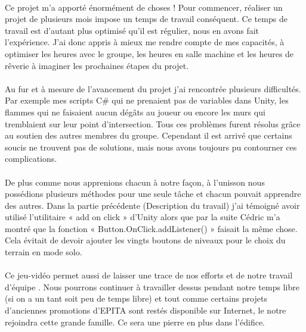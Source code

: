 \documentclass[titlepage, 13px, a4paper]{report}
\begin{document}
\paragraph{} \hspace{0pt}
Ce projet m'a apporté énormément de choses ! Pour commencer, réaliser un projet
de plusieurs mois impose un temps de travail conséquent. Ce temps de travail est
d'autant plus optimisé qu'il est régulier, nous en avons fait l'expérience. J'ai donc
appris à mieux me rendre compte de mes capacités, à optimiser les heures avec le
groupe, les heures en salle machine et les heures de rêverie à imaginer les
prochaines étapes du projet. \\

\paragraph{} \hspace{0pt}
Au fur et à mesure de l'avancement du projet j'ai rencontrée plusieurs difficultés.
Par exemple mes scripts C\# qui ne prenaient pas de variables dans Unity, les
flammes qui ne faisaient aucun dégâts au joueur ou encore les murs qui
tremblaient sur leur point d'intersection. Tous ces problèmes furent résolus grâce
au soutien des autres membres du groupe. Cependant il est arrivé que certains
soucis ne trouvent pas de solutions, mais nous avons toujours pu contourner ces
complications. \\


\paragraph{} \hspace{0pt} 
De plus comme nous apprenions chacun à notre façon, à l’unisson nous
possédions plusieurs méthodes pour une seule tâche et chacun pouvait apprendre
des autres. Dans la partie précédente (Description du travail) j'ai témoigné avoir
utilisé l'utilitaire « add on click » d'Unity alors que par la suite Cédric m'a montré
que la fonction « Button.OnClick.addListener() » faisait la même chose. Cela évitait de devoir
ajouter les vingts boutons de niveaux pour le choix du terrain en mode solo. \\


\paragraph{} \hspace{0pt} 
Ce jeu-vidéo permet aussi de laisser une trace de nos efforts et de notre travail
d'équipe . Nous pourrons continuer à travailler dessus pendant notre temps libre
(si on a un tant soit peu de temps libre) et tout comme certains projets d'anciennes
promotions d'EPITA sont restés disponible sur Internet, le notre rejoindra cette
grande famille. Ce sera une pierre en plus dans l'édifice. \\
\end{document}
